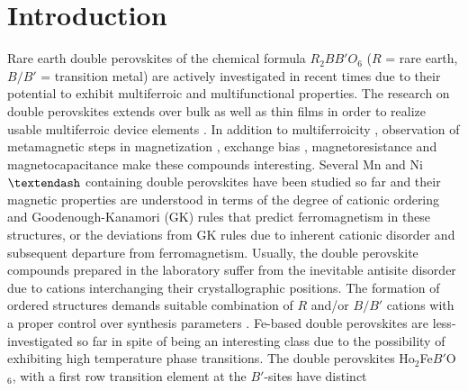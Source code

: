 \documentclass[12pt,twocolumns]{iopart}
\begin{document}
%
\submitto{\JPCM}
%
\maketitle
% 
%



\section{\label{intro}Introduction}
Rare earth double perovskites of the chemical formula
$R_2BB'O_6$ ($R$ = rare earth, $B/B'$ = transition metal)
are actively investigated in recent times due to their
potential to exhibit multiferroic and multifunctional properties.
The research on double perovskites extends over bulk as well as thin films in order to
realize usable multiferroic device elements
\cite{singh2010multiferroic,yanez2011multiferroic,ramesh2007multiferroics,kobayashi1998room}.
In addition to multiferroicity \cite{yanez2011multiferroic},
observation of metamagnetic steps in magnetization \cite{nair2014magnetization},
exchange bias \cite{nair2015antisite}, 
magnetoresistance and magnetocapacitance \cite{rogado2005magnetocapacitance} 
make these compounds interesting.
Several Mn and Ni $\textendash$ containing double perovskites \cite{booth2009investigation} 
have been studied so far and their magnetic properties are understood
in terms of the degree of cationic ordering and Goodenough-Kanamori (GK)
rules \cite{goodenough1955theory} that predict
ferromagnetism in these structures, or the deviations from GK rules
due to inherent cationic disorder and subsequent departure from ferromagnetism.
Usually, the double perovskite compounds prepared in the laboratory
suffer from the inevitable antisite disorder due to cations interchanging
their crystallographic positions.
The formation of ordered structures demands suitable combination of $R$ and/or $B/B'$ cations
with a proper control over synthesis parameters \cite{sarma2000magnetoresistance}.
Fe-based double perovskites are less-investigated
so far in spite of being an interesting class due to the possibility of exhibiting
high temperature phase transitions. The double perovskites Ho$_2$Fe$B'$O$_6$, 
with a first row transition element at the $B'$-sites have distinct 
\end{document}
